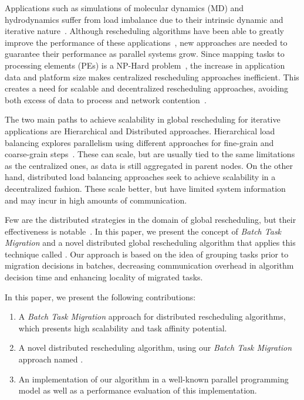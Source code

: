 Applications such as simulations of molecular dynamics (MD) and hydrodynamics suffer from load imbalance due to their intrinsic dynamic and iterative nature~\cite{namd,IPDPS13:LULESH}.
Although rescheduling algorithms have been able to greatly improve the performance of these applications~\cite{namd0}, new approaches are needed to guarantee their performance as parallel systems grow.
Since mapping tasks to processing elements (PEs) is a NP-Hard problem~\cite{npcomplete}, the increase in application data and platform size makes centralized rescheduling approaches inefficient.
This creates a need for scalable and decentralized rescheduling approaches, avoiding both excess of data to process and network contention~\cite{trahay2009scalable}.

The two main paths to achieve scalability in global rescheduling for iterative applications are Hierarchical and Distributed approaches.
Hierarchical load balancing explores parallelism using different approaches for fine-grain and coarse-grain steps~\cite{hybrid}.
These can scale, but are usually tied to the same limitations as the centralized ones, as data is still aggregated in parent nodes.
On the other hand, distributed load balancing approaches seek to achieve scalability in a decentralized fashion.
These scale better, but have limited system information and may incur in high amounts of communication.

Few are the distributed strategies in the domain of global rescheduling, but their effectiveness is notable~\cite{grapevine,diffus}.
In this paper, we present the concept of \textit{Batch Task Migration} and a novel distributed global rescheduling algorithm that applies this technique called \packdrop.
Our approach is based on the idea of grouping tasks prior to migration decisions in batches, decreasing communication overhead in algorithm decision time and enhancing locality of migrated tasks.

In this paper, we present the following contributions: 
\begin{enumerate}
	\item A \textit{Batch Task Migration} approach for distributed rescheduling algorithms, which presents high scalability and task affinity potential.
	\item A novel distributed rescheduling algorithm, using our \textit{Batch Task Migration} approach named \packdrop.
	\item An implementation of our algorithm in a well-known parallel programming model as well as a performance evaluation of this implementation.
\end{enumerate}

